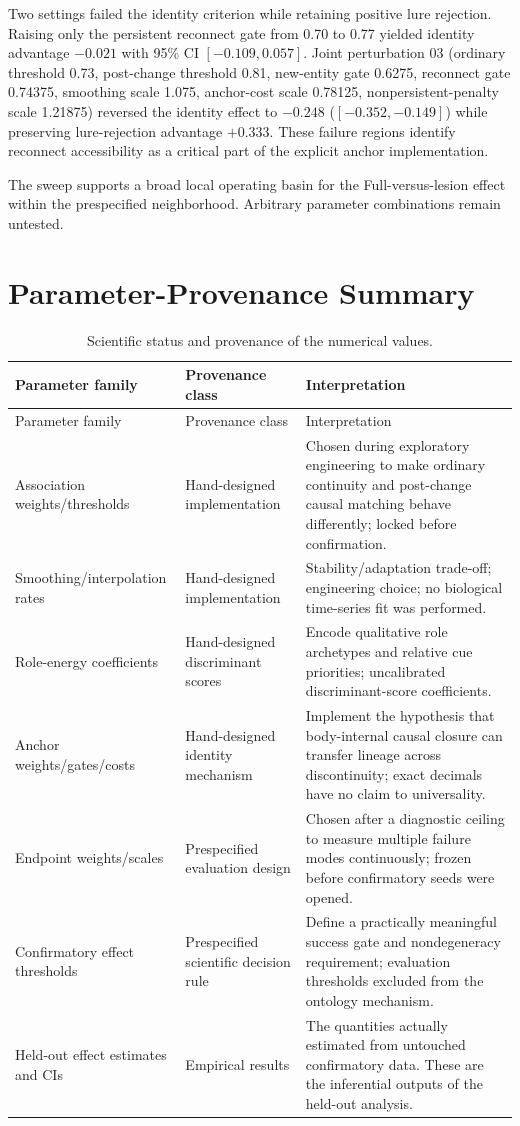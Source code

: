\documentclass[10pt,journal,onecolumn]{IEEEtran}
\begin{document}
Two settings failed the identity criterion while retaining positive lure rejection. Raising only the persistent reconnect gate from 0.70 to 0.77 yielded identity advantage $-0.021$ with 95\% CI $[-0.109,0.057]$. Joint perturbation 03 (ordinary threshold 0.73, post-change threshold 0.81, new-entity gate 0.6275, reconnect gate 0.74375, smoothing scale 1.075, anchor-cost scale 0.78125, nonpersistent-penalty scale 1.21875) reversed the identity effect to $-0.248$ ($[-0.352,-0.149]$) while preserving lure-rejection advantage $+0.333$. These failure regions identify reconnect accessibility as a critical part of the explicit anchor implementation.

The sweep supports a broad local operating basin for the Full-versus-lesion effect within the prespecified neighborhood. Arbitrary parameter combinations remain untested.

\section{Parameter-Provenance Summary}
\footnotesize
\setlength{\tabcolsep}{4pt}
\begin{longtable}{@{}p{}p{}p{}@{}}
\caption{Scientific status and provenance of the numerical values.}\label{tab:provenance}\\
\toprule
Parameter family & Provenance class & Interpretation \\
\midrule
\endfirsthead
\toprule
Parameter family & Provenance class & Interpretation \\
\midrule
\endhead
Association weights/thresholds & Hand-designed implementation & Chosen during exploratory engineering to make ordinary continuity and post-change causal matching behave differently; locked before confirmation. \\
Smoothing/interpolation rates & Hand-designed implementation & Stability/adaptation trade-off; engineering choice; no biological time-series fit was performed. \\
Role-energy coefficients & Hand-designed discriminant scores & Encode qualitative role archetypes and relative cue priorities; uncalibrated discriminant-score coefficients. \\
Anchor weights/gates/costs & Hand-designed identity mechanism & Implement the hypothesis that body-internal causal closure can transfer lineage across discontinuity; exact decimals have no claim to universality. \\
Endpoint weights/scales & Prespecified evaluation design & Chosen after a diagnostic ceiling to measure multiple failure modes continuously; frozen before confirmatory seeds were opened. \\
Confirmatory effect thresholds & Prespecified scientific decision rule & Define a practically meaningful success gate and nondegeneracy requirement; evaluation thresholds excluded from the ontology mechanism. \\
Held-out effect estimates and CIs & Empirical results & The quantities actually estimated from untouched confirmatory data. These are the inferential outputs of the held-out analysis. \\
\bottomrule
\end{longtable}
\normalsize
\end{document}
